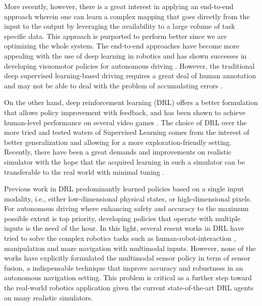 \documentclass[../thesis.tex]{subfiles}
\begin{document}

More recently, however, there is a great interest in applying an end-to-end approach wherein one can learn a complex mapping that goes directly from the input to the output by leveraging the availability to a large volume of task specific data. 
This approach is purported to perform better since we are optimizing the whole system. 
The end-to-end approaches have become more appealing with the use of deep learning in robotics and has shown successes in developing visuomotor policies for autonomous driving \cite{deepdriving,nvidiacar,endtoendcars}. 
However, the traditional deep supervised learning-based driving requires a great deal of human annotation and may not be able to deal with the problem of accumulating errors \cite{ross2011reduction}. 


On the other hand, deep reinforcement learning (DRL) offers a better formulation that allows policy improvement with feedback, and has been shown to achieve human-level performance on several video games \cite{mnih2013playing, mnih2015human,2016-TOG-deepRL}.
The choice of DRL over the more tried and tested waters of Supervised Learning comes from the interest of better generalization and allowing for a more exploration-friendly setting. 
Recently, there have been a great demands and improvements on realistic simulator \cite{deepdrive,udacity} with the hope that the acquired learning in such a simulator can be transferable to the real world with minimal tuning \cite{you2017virtual}. 


Previous work in DRL predominantly learned policies based on a single input modality, i.e., either low-dimensional physical states, or high-dimensional pixels. 
For autonomous driving where enhancing safety and accuracy to the maximum possible extent is top priority, developing policies that operate with multiple inputs is the need of the hour. 
In this light, several resent works in DRL have tried to solve the complex robotics tasks such as human-robot-interaction \cite{qureshi2016robot}, manipulation \cite{levine2016end} and maze navigation \cite{mirowski2017a} with multimodal inputs. 
However, none of the works have explicitly formulated the multimodal sensor policy in term of sensor fusion, a indispensable technique that improve accuracy and robustness in an autonomous navigation setting. 
This problem is critical as a further step toward the real-world robotics application given the current state-of-the-art DRL agents on many realistic simulators.
\end{document}
